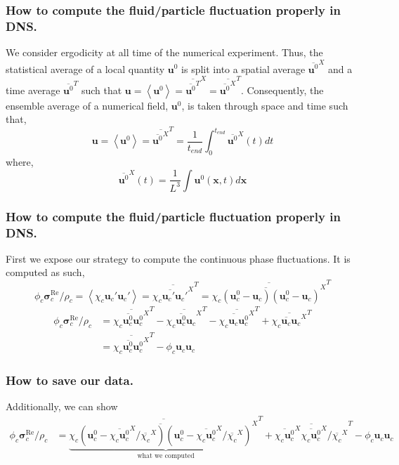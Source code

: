 \documentclass{sintefbeamer}
\newcommand{\avg}[1]{\left<#1\right>}
\newcommand{\avgcond}[1]{\overline{#1}}
\newcommand{\Tavg}[1]{\avgcond{#1}^T}
\newcommand{\Xavg}[1]{\avgcond{#1}^X}
\begin{document}
\begin{frame}
  \frametitle{How to compute the fluid/particle fluctuation properly in DNS. }


We consider ergodicity at all time of the numerical experiment.
Thus, the statistical average of a local quantity $\textbf{u}^0$ is split into a spatial average $\Xavg{\textbf{u}^0}$ and a time average $\Tavg{\textbf{u}^0}$ such that $\textbf{u} = \avg{\textbf{u}^0} = \Xavg{\Tavg{\textbf{u}^0}}=\Tavg{\Xavg{\textbf{u}^0}}$.
Consequently, the ensemble average of a numerical field, $\textbf{u}^0$, is taken through space and time such that,
\begin{equation}
    \textbf{u}
    = \avg{\textbf{u}^0}
    = \Tavg{\Xavg{\textbf{u}^0}}
    = \frac{1}{t_{end}}\int_{0}^{t_{end}} 
    \Xavg{\textbf{u}^0}(t) dt
\end{equation}
where, 
\begin{equation}
    \Xavg{\textbf{u}^0}(t)
    = \frac{1}{L^3}\int 
    \textbf{u}^0(\textbf{x},t) d\textbf{x}
\end{equation}
  
\end{frame}
\begin{frame}
  \frametitle{How to compute the fluid/particle fluctuation properly in DNS. }
  First we expose our strategy to compute the continuous phase fluctuations. 
  It is computed as such, 
  \begin{equation}
      \phi_c \bm{\sigma}^{\text{Re}}_c /\rho_c
      = \avg{\chi_c \textbf{u}_c' \textbf{u}_c'}
      = \Tavg{\Xavg{\chi_c \textbf{u}_c' \textbf{u}_c'}}
      = \Tavg{\Xavg{\chi_c (\textbf{u}_c^0 -\textbf{u}_c ) (\textbf{u}_c^0 -\textbf{u}_c)}}
  \end{equation}
\begin{align*}
  \phi_c \bm{\sigma}^{\text{Re}}_c /\rho_c
    &= \Tavg{\Xavg{\chi_c \textbf{u}_c^0 \textbf{u}_c^0}}
    - \Tavg{\Xavg{\chi_c \textbf{u}_c^0 \textbf{u}_c}}
    - \Tavg{\Xavg{\chi_c \textbf{u}_c \textbf{u}_c^0}}
    + \Tavg{\Xavg{\chi_c \textbf{u}_c \textbf{u}_c}}\\
    &= \Tavg{\Xavg{\chi_c \textbf{u}_c^0 \textbf{u}_c^0}}
    -  \phi_c  \textbf{u}_c \textbf{u}_c 
\end{align*}
  
\end{frame}
\begin{frame}
  \frametitle{How to save our data. }
 Additionally, we can show
 \begin{align*}
  \phi_c \bm{\sigma}^{\text{Re}}_c /\rho_c
  &= 
  \underbrace{\Tavg{\Xavg{\chi_c (\textbf{u}_c^0 -\Xavg{\chi_c\textbf{u}_c^0} / \Xavg{\chi_c} ) (\textbf{u}_c^0 -\Xavg{\chi_c\textbf{u}_c^0} / \Xavg{\chi_c} )}}}_{\text{what we computed}}
  + \Tavg{\Xavg{\chi_c \textbf{u}_c^0}\Xavg{\chi_c\textbf{u}_c^0} / \Xavg{\chi_c}}
  -  \phi_c  \textbf{u}_c \textbf{u}_c 
\end{align*}
  
\end{frame}
\end{document}
